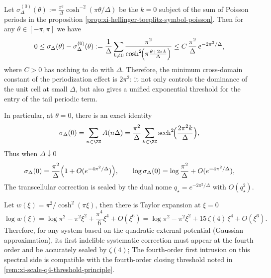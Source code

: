 \begin{remark}\label{rem:xi-hellinger-toeplitz-periodization-constant-2pi2}
Let \(\sigma_\Delta^{(0)}(\theta):=\frac{\pi^2}{\Delta}\cosh^{-2}(\pi\theta/\Delta)\) be the \(k=0\) subject of the sum of Poisson periods in the proposition \ref{prop:xi-hellinger-toeplitz-symbol-poisson}.
Then for any \(\theta\in[-\pi,\pi]\) we have
\[
0\le \sigma_\Delta(\theta)-\sigma_\Delta^{(0)}(\theta)
:=\frac{1}{\Delta}\sum_{k\neq 0}\frac{\pi^{2}}{\cosh^{2}\!\Bigl(\pi\frac{\theta+2\pi k}{\Delta}\Bigr)}
\le C\,\frac{\pi^{2}}{\Delta}\,e^{-2\pi^{2}/\Delta},
\]
where \(C>0\) has nothing to do with \(\Delta\).
Therefore, the minimum cross-domain constant of the periodization effect is \(2\pi^2\): it not only controls the dominance of the unit cell at small \(\Delta\), but also gives a unified exponential threshold for the entry of the tail periodic term.
\par
In particular, at \(\theta=0\), there is an exact identity
\[
\sigma_\Delta(0)=\sum_{n\in\ZZ}A(n\Delta)
=\frac{\pi^{2}}{\Delta}\sum_{k\in\ZZ}\mathrm{sech}^{2}\!\Bigl(\frac{2\pi^{2}k}{\Delta}\Bigr),
\]
Thus when \(\Delta\downarrow 0\)
\[
\sigma_\Delta(0)=\frac{\pi^{2}}{\Delta}\Bigl(1+O(e^{-4\pi^{2}/\Delta})\Bigr),
\qquad
\log\sigma_\Delta(0)=\log\frac{\pi^{2}}{\Delta}+O(e^{-4\pi^{2}/\Delta}),
\]
The transcellular correction is sealed by the dual nome \(q_\star=e^{-2\pi^{2}/\Delta}\) with \(O(q_\star^{2})\).
\end{remark}

\begin{remark}\label{rem:xi-hellinger-logw-zeta4-entry}
Let \(w(\xi)=\pi^2/\cosh^2(\pi\xi)\), then there is Taylor expansion at \(\xi=0\)
\[
\log w(\xi)=\log\pi^2-\pi^2\xi^2+\frac{\pi^4}{6}\xi^4+O(\xi^6)
=\log\pi^2-\pi^2\xi^2+15\,\zeta(4)\,\xi^4+O(\xi^6).
\]
Therefore, for any system based on the quadratic external potential (Gaussian approximation), its first indelible systematic correction must appear at the fourth order and be accurately sealed by \(\zeta(4)\);
The fourth-order first intrusion on this spectral side is compatible with the fourth-order closing threshold noted in \ref{rem:xi-scale-q4-threshold-principle}.
\end{remark}

